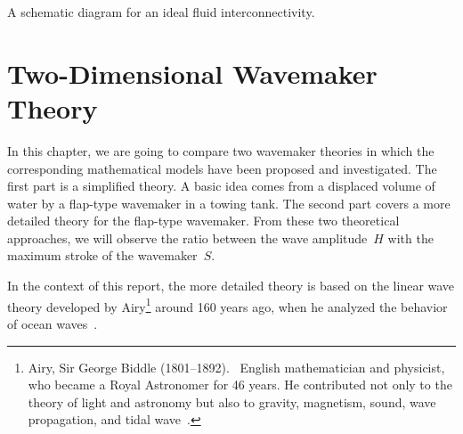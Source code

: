 \documentclass[12pt,a4paper]{report}
\begin{document}
\begin{center}
A schematic diagram for an ideal fluid interconnectivity. \vspace*{0.5cm} \\
\end{center}

\chapter{Two-Dimensional Wavemaker Theory}   \label{wavemaker}

In this chapter, we are going to compare two wavemaker theories in which the corresponding mathematical models have been proposed and investigated. The first part is a simplified theory. A basic idea comes from a displaced volume of water by a flap-type wavemaker in a towing tank. The second part covers a more detailed theory for the flap-type wavemaker. From these two theoretical approaches, we will observe the ratio between the wave amplitude~$H$ with the maximum stroke of the wavemaker~$S$.

In the context of this report, the more detailed theory is based on the linear wave theory developed by Airy\footnote[1]{Airy, Sir George Biddle (1801--1892). \ English mathematician and physicist, who became a Royal Astronomer for 46 years. He contributed not only to the theory of light and astronomy but also to gravity, magnetism, sound, wave propagation, and tidal wave~\cite{jrs}.} around 160 years ago, when he analyzed the behavior of ocean waves~\cite{aph}.
\end{document}
